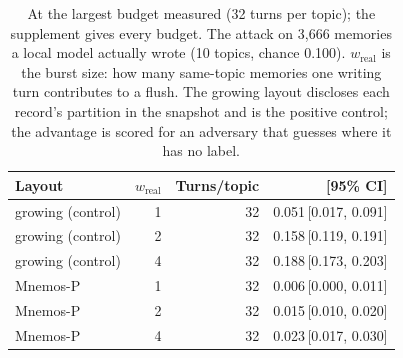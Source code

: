 \begin{table}[t]
\centering
\caption{At the largest budget measured (32 turns per topic); the supplement gives every budget. The attack on 3,666 memories a local model actually wrote (10 topics, chance 0.100). $w_{\mathrm{real}}$ is the burst size: how many same-topic memories one writing turn contributes to a flush. The growing layout discloses each record's partition in the snapshot and is the positive control; the advantage is scored for an adversary that guesses where it has no label.}
\label{tab:e2}
\small
\setlength{\tabcolsep}{4pt}
\begin{tabular}{lrrr}
\toprule
Layout & $w_{\mathrm{real}}$ & Turns/topic & \advhist{} [95\% CI] \\
\midrule
growing (control) & 1 & 32 & 0.051\,[0.017, 0.091] \\
growing (control) & 2 & 32 & 0.158\,[0.119, 0.191] \\
growing (control) & 4 & 32 & 0.188\,[0.173, 0.203] \\
Mnemos-P & 1 & 32 & 0.006\,[0.000, 0.011] \\
Mnemos-P & 2 & 32 & 0.015\,[0.010, 0.020] \\
Mnemos-P & 4 & 32 & 0.023\,[0.017, 0.030] \\
\bottomrule
\end{tabular}
\end{table}
